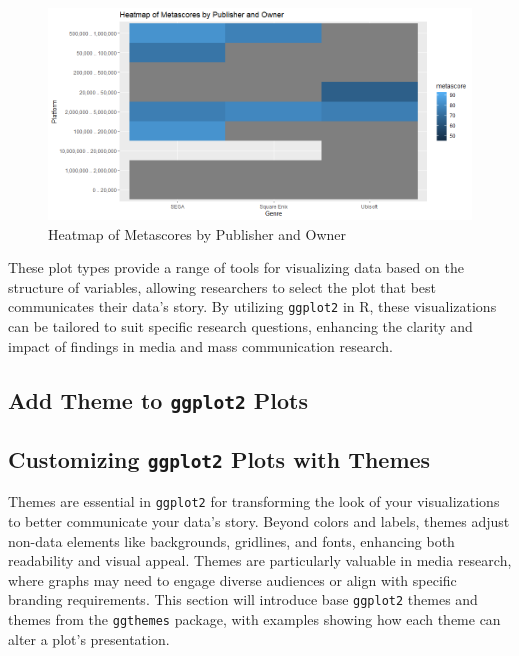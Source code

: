\documentclass[
]{book}
\begin{document}
\begin{figure}
\centering
\includegraphics[width=1\textwidth,height=\textheight]{images/heatmap.png}
\caption{Heatmap of Metascores by Publisher and Owner}
\end{figure}

These plot types provide a range of tools for visualizing data based on the structure of variables, allowing researchers to select the plot that best communicates their data's story. By utilizing \texttt{ggplot2} in R, these visualizations can be tailored to suit specific research questions, enhancing the clarity and impact of findings in media and mass communication research.

\subsection*{\texorpdfstring{Add Theme to \texttt{ggplot2} Plots}{Add Theme to ggplot2 Plots}}\label{add-theme-to-ggplot2-plots}

\subsection*{\texorpdfstring{Customizing \texttt{ggplot2} Plots with Themes}{Customizing ggplot2 Plots with Themes}}\label{customizing-ggplot2-plots-with-themes}

Themes are essential in \texttt{ggplot2} for transforming the look of your visualizations to better communicate your data's story. Beyond colors and labels, themes adjust non-data elements like backgrounds, gridlines, and fonts, enhancing both readability and visual appeal. Themes are particularly valuable in media research, where graphs may need to engage diverse audiences or align with specific branding requirements. This section will introduce base \texttt{ggplot2} themes and themes from the \texttt{ggthemes} package, with examples showing how each theme can alter a plot's presentation.
\end{document}
